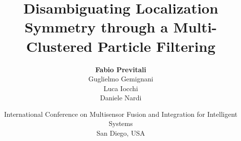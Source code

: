 \documentclass{beamer}
\title[Disambiguating Localization Symmetry through a M-C PF]{\Large Disambiguating Localization Symmetry through a Multi-Clustered Particle Filtering}
\subtitle{}
\author[Fabio Previtali]{\small\textbf{Fabio Previtali}\\Guglielmo Gemignani\\Luca Iocchi\\Daniele Nardi}
\date[September 16, 2015]{\scriptsize International Conference on Multisensor Fusion and Integration for Intelligent Systems\\San Diego, USA}
\begin{document}
\begin{frame}[plain]
	\titlepage
\end{frame}






\end{document}
